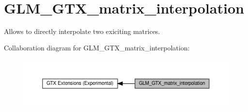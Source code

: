 \hypertarget{group__gtx__matrix__interpolation}{}\section{G\+L\+M\+\_\+\+G\+T\+X\+\_\+matrix\+\_\+interpolation}
\label{group__gtx__matrix__interpolation}


Allows to directly interpolate two exiciting matrices.  


Collaboration diagram for G\+L\+M\+\_\+\+G\+T\+X\+\_\+matrix\+\_\+interpolation\+:\nopagebreak
\begin{figure}[H]
\begin{center}
\leavevmode
\includegraphics[width=350pt]{group__gtx__matrix__interpolation}
\end{center}
\end{figure}
